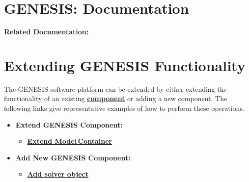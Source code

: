 \documentclass[12pt]{article}
\begin{document}
\section*{GENESIS: Documentation}

{\bf Related Documentation:}

\section*{Extending GENESIS Functionality}

The GENESIS software platform can be extended by either extending the functionality of an existing \href{../reserved-words/reserved-words.tex}{\bf component} or adding a new component. The following links give representative examples of how to perform these operations.

\begin{itemize}
   \item[]{\bf Extend GENESIS Component:}
      \begin{itemize}
         \item[]\href{../genesis-extend-model-container/genesis-extend-model-container.tex}{\bf Extend Model\,Container}
      \end{itemize}
      
   \item[]{\bf Add New GENESIS Component:}
      \begin{itemize}
         \item[]\href{../genesis-add-solver-object/genesis-add-solver-object.tex}{\bf Add solver object}
      \end{itemize}
   
\end{itemize}
\end{document}
